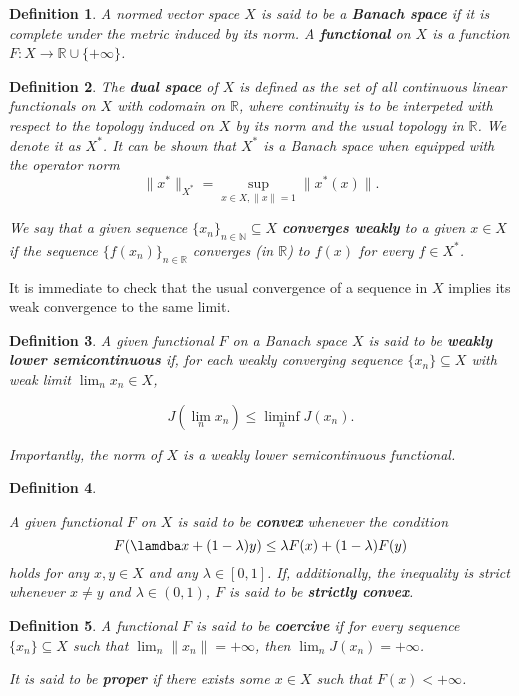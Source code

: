 \documentclass[twocolumn,twoside,a4paper,10pt]{IEEEtran}
\newtheorem{definition}{Definition}
\begin{document}
\begin{definition}
  A normed vector space \(X\) is said to be a \textbf{Banach space} if it is complete under the metric induced by its norm. A \textbf{functional} on \(X\) is a function \(F\colon X\to\mathbb{R}\cup\{+\infty\}\).
\end{definition}

\begin{definition}
  The \textbf{dual space} of \(X\) is defined as the set of all continuous linear functionals on \(X\) with codomain on \(\mathbb{R}\), where continuity is to be interpeted with respect to the topology induced on \(X\) by its norm and the usual topology in \(\mathbb{R}\). We denote it as \(X^*\). It can be shown that \(X^*\) is a Banach space when equipped with the operator norm
  \[
    \|x^*\|_{X^*} = \sup_{x\in X, \|x\|=1}\|x^*(x)\|
  .\]

  We say that a given sequence \(\{x_n\}_{n\in\mathbb{N}}\subseteq X\) \textbf{converges weakly} to a given \(x\in X\) if the sequence \(\{f(x_n)\}_{n\in\mathbb{R}}\) converges (in \(\mathbb{R}\)) to \(f(x)\) for every \(f\in X^*\).
\end{definition}

It is immediate to check that the usual convergence of a sequence in \(X\) implies its weak convergence to the same limit.

\begin{definition}
  A given functional \(F\) on a Banach space \(X\) is said to be \textbf{weakly lower semicontinuous} if, for each weakly converging sequence \(\{x_n\}\subseteq X\) with weak limit \(\lim_nx_n\in X\),

  \[
    J(\lim_nx_n)\leq \liminf_n J(x_n)
  .\]

  Importantly, the norm of \(X\) is a weakly lower semicontinuous functional.
\end{definition}

\begin{definition}\label{def:convexity}

  A given functional \(F\) on \(X\) is said to be \textbf{convex} whenever the condition
  \[
    F(\lamdba x + (1-\lambda)y) \leq \lambda F(x) + (1-\lambda) F(y)
  \]
  holds for any \(x, y\in X\) and any \(\lambda\in[0, 1]\). If, additionally, the inequality is strict whenever \(x\neq y\) and \(\lambda\in (0, 1)\), \(F\) is said to be \textbf{strictly convex}.
\end{definition}

\begin{definition}
  A functional \(F\) is said to be \textbf{coercive} if for every sequence \(\{x_n\}\subseteq X\) such that \(\lim_n \|x_n\|=+\infty\), then \(\lim_nJ(x_n)=+\infty\).

  It is said to be \textbf{proper} if there exists some \(x\in X\) such that \(F(x) < +\infty\).
\end{definition}
\end{document}
